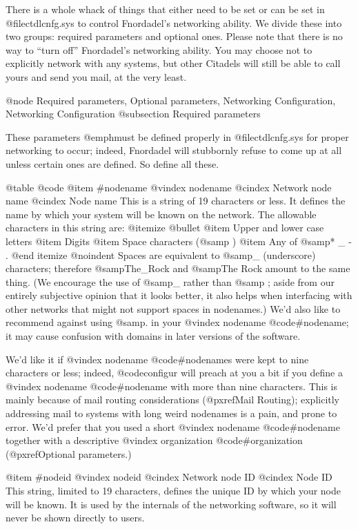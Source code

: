 There is a whole whack of things that either need to be set or
can be set in @file{ctdlcnfg.sys} to control Fnordadel's networking ability.
We divide these into two groups: required parameters and optional ones.
Please note that there is no way to ``turn off'' Fnordadel's networking
ability.  You may choose not to explicitly network with any systems, but
other Citadels will still be able to call yours and send you mail, at
the very least.

@node Required parameters, Optional parameters, Networking Configuration, Networking Configuration
@subsection Required parameters

These parameters @emph{must} be defined properly in @file{ctdlcnfg.sys}
for proper networking to occur; indeed, Fnordadel will stubbornly refuse to
come up at all unless certain ones are defined.  So define all
these.

@table @code
@item #nodename
@vindex nodename
@cindex Network node name
@cindex Node name
This is a string of 19 characters or less.  It
defines the name by which your system will be known on
the network.  The allowable characters in this string are:
@itemize @bullet
@item
Upper and lower case letters
@item
Digits
@item
Space characters (@samp{ })
@item
Any of @samp{* _ - .}
@end itemize
@noindent
Spaces are equivalent to @samp{_} (underscore) characters; therefore
@samp{The_Rock} and @samp{The Rock} amount to the same thing.  (We
encourage the use of @samp{_} rather than @samp{ }; aside from our entirely
subjective opinion that it looks better, it also helps when interfacing
with other networks that might not support spaces in nodenames.)
We'd also like
to recommend against using @samp{.} in your
@vindex nodename
@code{#nodename}; it may
cause confusion with domains in later versions of the
software.

We'd like it if
@vindex nodename
@code{#nodename}s were kept to nine
characters or less; indeed, @code{configur} will preach at
you a bit if you define a
@vindex nodename
@code{#nodename} with more than nine
characters.  This is mainly because of mail routing
considerations (@pxref{Mail Routing}); explicitly addressing
mail to systems with long weird nodenames is a pain, and
prone to error.  We'd prefer that you used a short
@vindex nodename
@code{#nodename} together with a descriptive
@vindex organization
@code{#organization}
(@pxref{Optional parameters}.)

@item #nodeid
@vindex nodeid
@cindex Network node ID
@cindex Node ID
This string, limited to 19 characters, defines the
unique ID by which your node will be known.  It is used
by the internals of the networking software, so it will
never be shown directly to users.

